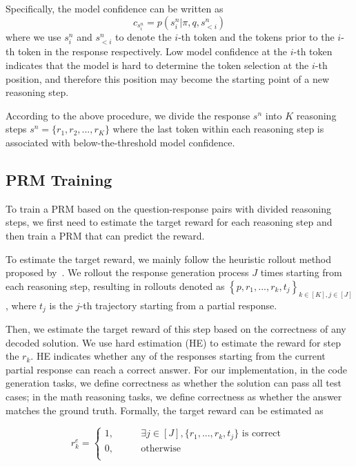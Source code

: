 Specifically, the model confidence can be written as 
\begin{equation}
    c_{s^n_i} =  p(s^n_i | \pi, q, s^n_{<i})
\label{equ:confidence}
\end{equation}
where we use $s_i^n$ and $s^n_{<i}$ 
 to denote the $i$-th token and the tokens prior to the $i$-th token in the response respectively. Low model confidence at the $i$-th token indicates that the model is hard to determine the token selection at the $i$-th position, and therefore this position may become the starting point of a new reasoning step.

According to the above procedure, we divide the response $s^n$ into $K$ reasoning steps $s^n = \{r_1, r_2, ..., r_K\}$ where the last token within each reasoning step is associated with below-the-threshold model confidence.




\subsection{PRM Training}

To train a PRM based on the question-response pairs with divided reasoning steps, we first need to estimate the target reward for each reasoning step and then train a PRM that can predict the reward.

To estimate the target reward, we mainly follow the heuristic rollout method proposed by~\citet{wang2024mathshepherdverifyreinforcellms}. 
We rollout the response generation process $J$ times starting from each reasoning step, resulting in rollouts denoted as $\left\{p, r_1, ..., r_k, t_j\right\}_{k\in [K], j\in [J]}$, where $t_j$ is the $j$-th trajectory starting from a partial response.



Then, we estimate the target reward of this step based on the correctness of any decoded solution. We use hard estimation (HE) to estimate the reward for step the $r_k$.
HE indicates whether any of the responses starting from the current partial response can reach a correct answer. 
For our implementation, in the code generation tasks, we define correctness as whether the solution can pass all test cases; in the math reasoning tasks, we define correctness as whether the answer matches the ground truth.
Formally, the target reward can be estimated as

\begin{equation}
r_k^e=\left\{
\begin{aligned}
1, \qquad & \exists j \in [J], \{r_1, ..., r_k, t_j\} \text{ is correct } \\
0, \qquad & \mathrm{otherwise} \\
\end{aligned}
\right.
\label{eqa:HE}
\end{equation}

